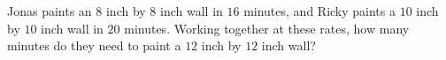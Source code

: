 Jonas paints an $8$ inch by $8$ inch wall in $16$ minutes, and Ricky paints a $10$ inch by $10$ inch wall in $20$ minutes. Working together at these rates, how many minutes do they need to paint a $12$ inch by $12$ inch wall?
